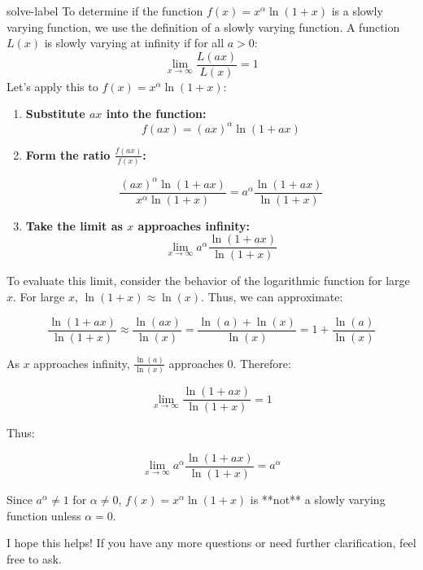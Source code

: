 	\begin{solve}{}{solve-label}
	To determine if the function \( f(x) = x^\alpha \ln(1+x) \) is a slowly varying function, we use the definition of a slowly varying function. A function \( L(x) \) is slowly varying at infinity if for all \( a > 0 \):
	$$ \lim_{x \to \infty} \frac{L(ax)}{L(x)} = 1 $$
	Let's apply this to \( f(x) = x^\alpha \ln(1+x) \):
	\begin{enumerate}
		\item \textbf{Substitute \( ax \) into the function:}
		$$f(ax) = (ax)^\alpha \ln(1+ax)$$
		\item \textbf{Form the ratio \( \frac{f(ax)}{f(x)} \):}
		
		$$\frac{(ax)^\alpha \ln(1+ax)}{x^\alpha \ln(1+x)} = a^\alpha \frac{\ln(1+ax)}{\ln(1+x)}$$
		\item \textbf{Take the limit as \( x \) approaches infinity:}
		$$\lim_{x \to \infty} a^\alpha \frac{\ln(1+ax)}{\ln(1+x)}$$
	\end{enumerate}
	
	To evaluate this limit, consider the behavior of the logarithmic function for large \( x \). For large \( x \), \( \ln(1+x) \approx \ln(x) \). Thus, we can approximate:
	
	\[
	\frac{\ln(1+ax)}{\ln(1+x)} \approx \frac{\ln(ax)}{\ln(x)} = \frac{\ln(a) + \ln(x)}{\ln(x)} = 1 + \frac{\ln(a)}{\ln(x)}
	\]
	
	As \( x \) approaches infinity, \( \frac{\ln(a)}{\ln(x)} \) approaches 0. Therefore:
	
	\[
	\lim_{x \to \infty} \frac{\ln(1+ax)}{\ln(1+x)} = 1
	\]
	
	Thus:
	
	\[
	\lim_{x \to \infty} a^\alpha \frac{\ln(1+ax)}{\ln(1+x)} = a^\alpha
	\]
	
	Since \( a^\alpha \neq 1 \) for \( \alpha \neq 0 \), \( f(x) = x^\alpha \ln(1+x) \) is **not** a slowly varying function unless \( \alpha = 0 \).
	
	I hope this helps! If you have any more questions or need further clarification, feel free to ask. \cite{r1,r2,r3,r4,r5,r6,r7,r8,r9,10,r11}
	\end{solve}
	
	
	
	
	
